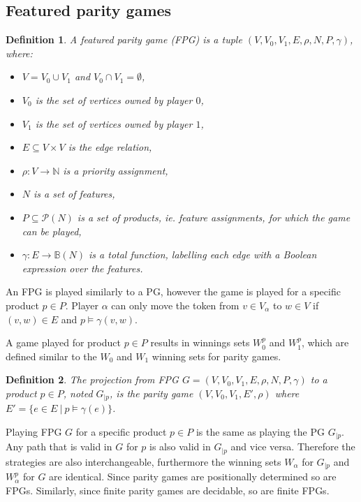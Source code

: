 \documentclass[]{article}
\newtheorem{definition}{Definition}[section]
\begin{document}
\subsection{Featured parity games}
\begin{definition}
	\label{def_FPG}
	A featured parity game (FPG) is a tuple $(V,V_0, V_1, E, \rho, N, P, \gamma)$, where:
	\begin{itemize}
		\item $V = V_0 \cup V_1$ and $V_0 \cap V_1 = \emptyset$,
		\item $V_0$ is the set of vertices owned by player $0$,
		\item $V_1$ is the set of vertices owned by player $1$, 
		\item $E \subseteq V \times V$ is the edge relation,
		\item $\rho :  V \rightarrow \mathbb{N}$ is a priority assignment,
		\item $N$ is a set of features,
		\item $P \subseteq \mathcal{P}(N)$ is a set of products, ie. feature assignments, for which the game can be played,
		\item $\gamma : E \rightarrow \mathbb{B}(N)$ is a total function, labelling each edge with a Boolean expression over the features.
	\end{itemize}
\end{definition}
An FPG is played similarly to a PG, however the game is played for a specific product $p \in P$. Player $\alpha$ can only move the token from $v \in V_\alpha$ to $w \in V$ if $(v,w) \in E$ and $p \models \gamma(v,w)$.

A game played for product $p \in P$ results in winnings sets $W_0^p$ and $W_1^p$, which are defined similar to the $W_0$ and $W_1$ winning sets for parity games.

\begin{definition}
	\label{def_FPG_proj}
The projection from FPG $G = (V,V_0, V_1, E, \rho, N, P, \gamma)$ to a product $p \in P$, noted $G_{|p}$, is the parity game $(V,V_0,V_1, E', \rho)$ where $E' = \{ e \in E\ |\ p \models \gamma(e) \}$.
\end{definition}

Playing FPG $G$ for a specific product $p\in P$ is the same as playing the PG $G_{|p}$. Any path that is valid in $G$ for $p$ is also valid in $G_{|p}$ and vice versa. Therefore the strategies are also interchangeable, furthermore the winning sets $W_\alpha$ for $G_{|p}$ and $W_\alpha^p$ for $G$ are identical. Since parity games are positionally determined so are FPGs. Similarly, since finite parity games are decidable, so are finite FPGs.
\end{document}
